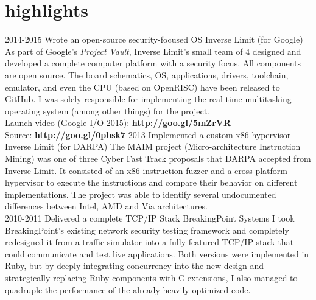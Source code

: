 \documentclass[]{friggeri-cv}
\begin{document}
\section{highlights}

\begin{entrylist}
  \entry
      {2014-2015}
      {Wrote an open-source security-focused OS}
      {Inverse Limit (for Google)}
      {
        As part of Google's \emph{Project Vault}, Inverse Limit's small team of 4 designed and developed a complete computer platform with a security focus. All components are open source. The board schematics, OS, applications, drivers, toolchain, emulator, and even the CPU (based on OpenRISC) have been released to GitHub. I was solely responsible for implementing the real-time multitasking operating system (among other things) for the project.\\
%        

        Launch video (Google I/O 2015): \hfill \href{http://goo.gl/5mZrVR}{\textbf{http://goo.gl/5mZrVR}}\\
        Source: \hfill \href{http://goo.gl/0pbsk7}{\textbf{http://goo.gl/0pbsk7}}
      }
  \entry
      {2013}
      {Implemented a custom x86 hypervisor}
      {Inverse Limit (for DARPA)}
      {The MAIM project (Micro-architecture Instruction Mining) was one of three Cyber Fast Track proposals that DARPA accepted from Inverse Limit. It consisted of an x86 instruction fuzzer and a cross-platform hypervisor to execute the instructions and compare their behavior on different implementations. The project was able to identify several undocumented differences between Intel, AMD and Via architectures.\\

      }
  \entry
      {2010-2011}
      {Delivered a complete TCP/IP Stack}
      {BreakingPoint Systems}
      {I took BreakingPoint's existing network security testing framework and completely redesigned it from a traffic simulator into a fully featured TCP/IP stack that could communicate and test live applications. Both versions were implemented in Ruby, but by deeply integrating concurrency into the new design and strategically replacing Ruby components with C extensions, I also managed to quadruple the performance of the already heavily optimized code.}
\end{entrylist}
\end{document}
